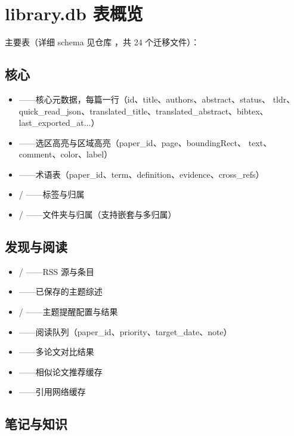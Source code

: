 \section{library.db 表概览}

主要表（详细 schema 见仓库 ，共 24 个迁移文件）：

\subsection{核心}

\begin{itemize}
  \item {}——核心元数据，每篇一行（id、title、authors、abstract、status、
    tldr、quick\_read\_json、translated\_title、translated\_abstract、bibtex、
    last\_exported\_at...）
  \item {}——选区高亮与区域高亮（paper\_id、page、boundingRect、
    text、comment、color、label）
  \item {}——术语表（paper\_id、term、definition、evidence、cross\_refs）
  \item {} / ——标签与归属
  \item {} / ——文件夹与归属（支持嵌套与多归属）
\end{itemize}

\subsection{发现与阅读}

\begin{itemize}
  \item {} / ——RSS 源与条目
  \item {}——已保存的主题综述
  \item {} / ——主题提醒配置与结果
  \item {}——阅读队列（paper\_id、priority、target\_date、note）
  \item {}——多论文对比结果
  \item {}——相似论文推荐缓存
  \item {}——引用网络缓存
\end{itemize}

\subsection{笔记与知识}

